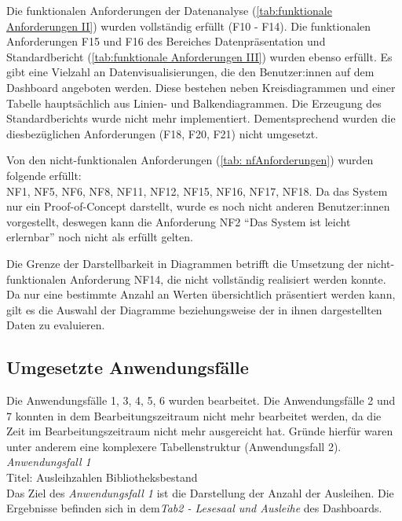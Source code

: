 Die funktionalen Anforderungen der Datenanalyse (\autoref{tab:funktionale Anforderungen II}) wurden vollständig erfüllt (F10 - F14).
Die funktionalen Anforderungen F15 und F16 des Bereiches Datenpräsentation und Standardbericht (\autoref{tab:funktionale Anforderungen III}) 
wurden ebenso erfüllt. Es gibt eine Vielzahl an Datenvisualisierungen, die den Benutzer:innen auf dem Dashboard angeboten werden. 
Diese bestehen neben Kreisdiagrammen und einer Tabelle hauptsächlich aus Linien- und Balkendiagrammen.
Die Erzeugung des Standardberichts wurde nicht mehr implementiert. Dementsprechend wurden die diesbezüglichen
Anforderungen (F18, F20, F21) nicht umgesetzt. 

Von den nicht-funktionalen Anforderungen (\autoref{tab: nfAnforderungen}) wurden folgende erfüllt:\\
NF1, NF5, NF6, NF8, NF11, NF12, NF15, NF16, NF17, NF18. 
Da das System nur ein Proof-of-Concept darstellt, wurde es noch nicht anderen
Benutzer:innen vorgestellt, deswegen kann die Anforderung NF2 \enquote{Das System ist leicht erlernbar} noch nicht als erfüllt gelten.

Die Grenze der Darstellbarkeit in Diagrammen betrifft die Umsetzung der nicht-funktionalen Anforderung NF14, die nicht vollständig
realisiert werden konnte. Da nur eine bestimmte Anzahl an Werten übersichtlich präsentiert werden kann, gilt es die Auswahl der Diagramme
beziehungsweise der in ihnen dargestellten Daten zu evaluieren. 



\subsection{Umgesetzte Anwendungsfälle}
Die Anwendungsfälle 1, 3, 4, 5, 6 wurden bearbeitet.
Die Anwendungsfälle 2 und 7 konnten in dem Bearbeitungszeitraum nicht mehr bearbeitet werden, 
da die Zeit im Bearbeitungszeitraum nicht mehr ausgereicht hat. Gründe hierfür waren unter anderem eine komplexere Tabellenstruktur (Anwendungsfall 2).\\


\noindent
\textit{Anwendungsfall 1}\\
Titel: Ausleihzahlen Bibliotheksbestand\\
Das Ziel des \textit{Anwendungsfall 1} ist die Darstellung der Anzahl der Ausleihen.
Die Ergebnisse befinden sich in dem\textit{Tab2 - Lesesaal und Ausleihe} des Dashboards.


